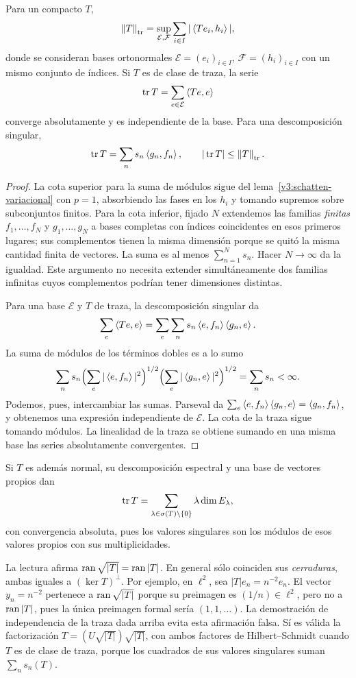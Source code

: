 \begin{proposicion}\label{v3:traza-variacional}
Para un compacto $T$,
\[\left\lVert T\right\rVert_{\mathrm{tr}}=
\sup_{\mathcal E,\mathcal F}\sum_{i\in I}|\left\langle Te_i,h_i\right\rangle|,
\]
donde se consideran bases ortonormales $\mathcal E=(e_i)_{i\in I}$, $\mathcal F=(h_i)_{i\in I}$ con un mismo conjunto de índices. Si $T$ es de clase de traza, la serie
\[\operatorname{tr} T=\sum_{e\in\mathcal E}\left\langle Te,e\right\rangle
\]
converge absolutamente y es independiente de la base. Para una descomposición singular,
\[\operatorname{tr} T=\sum_ns_n\left\langle g_n,f_n\right\rangle,\qquad |\operatorname{tr} T|\le\left\lVert T\right\rVert_{\mathrm{tr}}.
\]
\end{proposicion}
\begin{proof}
La cota superior para la suma de módulos sigue del lema~\ref{v3:schatten-variacional} con $p=1$, absorbiendo las fases en los $h_i$ y tomando supremos sobre subconjuntos finitos. Para la cota inferior, fijado $N$ extendemos las familias \emph{finitas} $f_1,\ldots,f_N$ y $g_1,\ldots,g_N$ a bases completas con índices coincidentes en esos primeros lugares; sus complementos tienen la misma dimensión porque se quitó la misma cantidad finita de vectores. La suma es al menos $\sum_{n=1}^Ns_n$. Hacer $N\to\infty$ da la igualdad. Este argumento no necesita extender simultáneamente dos familias infinitas cuyos complementos podrían tener dimensiones distintas.

Para una base $\mathcal E$ y $T$ de traza, la descomposición singular da
\[\sum_e\left\langle Te,e\right\rangle=\sum_e\sum_ns_n\left\langle e,f_n\right\rangle\left\langle g_n,e\right\rangle.
\]
La suma de módulos de los términos dobles es a lo sumo
\[\sum_ns_n\Bigl(\sum_e|\left\langle e,f_n\right\rangle|^2\Bigr)^{1/2}
\Bigl(\sum_e|\left\langle g_n,e\right\rangle|^2\Bigr)^{1/2}=\sum_ns_n<\infty.
\]
Podemos, pues, intercambiar las sumas. Parseval da $\sum_e\left\langle e,f_n\right\rangle\left\langle g_n,e\right\rangle=\left\langle g_n,f_n\right\rangle$, y obtenemos una expresión independiente de $\mathcal E$. La cota de la traza sigue tomando módulos. La linealidad de la traza se obtiene sumando en una misma base las series absolutamente convergentes.
\end{proof}
Si $T$ es además normal, su descomposición espectral y una base de vectores propios dan
\[\operatorname{tr} T=\sum_{\lambda\in\sigma(T)\setminus\{0\}}\lambda\dim E_\lambda,
\]
con convergencia absoluta, pues los valores singulares son los módulos de esos valores propios con sus multiplicidades.

\begin{observacion}
La lectura afirma $\operatorname{ran}\sqrt{|T|}=\operatorname{ran}|T|$. En general sólo coinciden sus \emph{cerraduras}, ambas iguales a $(\ker T)^\perp$. Por ejemplo, en $\ell^2$, sea $|T|e_n=n^{-2}e_n$. El vector $y_n=n^{-2}$ pertenece a $\operatorname{ran}\sqrt{|T|}$ porque su preimagen es $(1/n)\in\ell^2$, pero no a $\operatorname{ran}|T|$, pues la única preimagen formal sería $(1,1,\ldots)$. La demostración de independencia de la traza dada arriba evita esta afirmación falsa. Sí es válida la factorización $T=(U\sqrt{|T|})\sqrt{|T|}$, con ambos factores de Hilbert--Schmidt cuando $T$ es de clase de traza, porque los cuadrados de sus valores singulares suman $\sum_ns_n(T)$.
\end{observacion}


